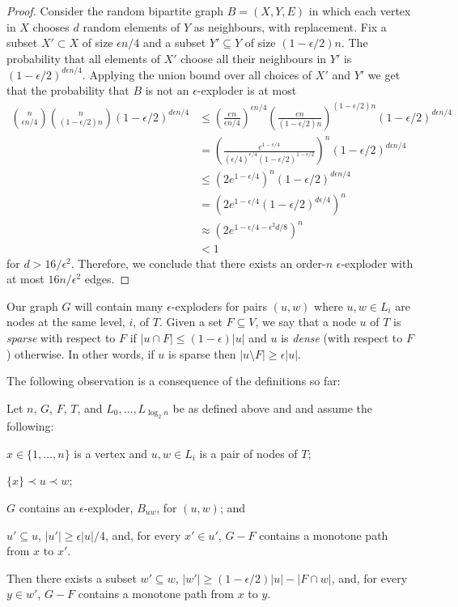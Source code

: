 \documentclass{patmorin}
\begin{document}
\begin{proof}
   Consider the random bipartite graph $B=(X,Y,E)$ in which each
   vertex in $X$ chooses $d$ random elements of $Y$ as neighbours, with
   replacement.  Fix a subset $X'\subset X$ of size $\epsilon n/4$ and
   a subset $Y'\subseteq Y$ of size $(1-\epsilon/2)n$.  The probability
   that all elements of $X'$ choose all their neighbours in $Y'$ is
   $(1-\epsilon/2)^{d\epsilon n/4}$.  Applying the union bound over
   all choices of $X'$ and $Y'$ we get that the probability that $B$
   is not an $\epsilon$-exploder is at most
  \begin{align*}
    \binom{n}{\epsilon n/4}\binom{n}{(1-\epsilon/2) n}(1-\epsilon/2)^{d\epsilon n/4} & 
    \le \left(\frac{en}{\epsilon n/4}\right)^{\epsilon n/4}
        \left(\frac{en}{(1-\epsilon/2)n}\right)^{(1-\epsilon/2)n}
              (1-\epsilon/2)^{d\epsilon n/4} \\
    & = \left(\frac{e^{1-\epsilon/4}}{(\epsilon /4)^{\epsilon/4}(1-\epsilon/2)^{1-\epsilon/2}}\right)^{n}
              (1-\epsilon/2)^{d\epsilon n/4} \\
    & \le \left(2e^{1-\epsilon/4}\right)^{n}
              (1-\epsilon/2)^{d\epsilon n/4} \\
    & = \left(2e^{1-\epsilon/4}(1-\epsilon/2)^{d\epsilon /4}\right)^{n} \\
    & \approx \left(2e^{1-\epsilon/4-\epsilon^2d/8}\right)^{n} \\
    & < 1
  \end{align*}
  for $d>16/\epsilon^2$.  Therefore, we conclude that there exists an order-$n$ $\epsilon$-exploder with at most $16n/\epsilon^2$ edges.
\end{proof}

Our graph $G$ will contain many $\epsilon$-exploders for pairs $(u,w)$
where $u,w\in L_i$ are nodes at the same level, $i$, of $T$.  Given a
set $F\subseteq V$, we say that a node $u$ of $T$ is \emph{sparse}
with respect to $F$ if $|u\cap F| \le (1-\epsilon)|u|$ and $u$ is
\emph{dense} (with respect to $F$) otherwise.  In other words, if $u$
is sparse then $|u\setminus F| \ge \epsilon |u|$.

The following observation is a consequence of the definitions so far:

\begin{obs}
  Let $n$, $G$, $F$, $T$, and $L_0,\ldots,L_{\log_2 n}$ be as defined above and
  and assume the following:
  \begin{compactenum}
     \item $x\in \{1,\ldots,n\}$ is a vertex and $u,w\in L_i$ 
      is a pair of nodes of $T$;
     \item $\{x\} \prec u\prec w$;
     \item $G$ contains an $\epsilon$-exploder, $B_{uw}$, for $(u,w)$; and
     \item $u'\subseteq u$, $|u'|\ge\epsilon|u|/4$, and, for every $x'\in u'$, $G-F$
   contains a monotone path from $x$ to $x'$.
   \end{compactenum}
   Then there exists a
  subset $w'\subseteq w$, $|w'|\ge(1-\epsilon/2)|u|-|F\cap w|$, and, for
   every $y\in w'$, $G-F$ contains a monotone path from $x$ to $y$.
\end{obs}
\end{document}
